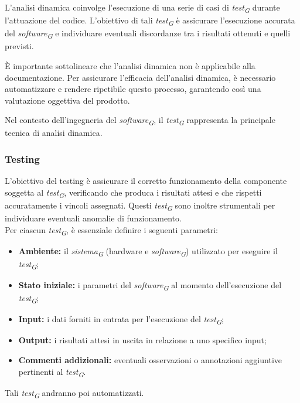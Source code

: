 \vspace{0.2cm}

L'analisi dinamica coinvolge l'esecuzione di una serie di casi di \textit{test}\textsubscript{\textit{G}} durante l'attuazione del codice. L'obiettivo di tali \textit{test}\textsubscript{\textit{G}} è assicurare l'esecuzione accurata del \textit{software}\textsubscript{\textit{G}} e individuare eventuali discordanze tra i risultati ottenuti e quelli previsti. 

\vspace{0.2cm}

È importante sottolineare che l'analisi dinamica non è applicabile alla documentazione.
Per assicurare l'efficacia dell'analisi dinamica, è necessario automatizzare e rendere ripetibile questo processo, garantendo così una valutazione oggettiva del prodotto.

Nel contesto dell'ingegneria del \textit{software}\textsubscript{\textit{G}}, il \textit{test}\textsubscript{\textit{G}} rappresenta la principale tecnica di analisi dinamica.

\subsubsection{Testing}
\label{subsubsec:Testing}
L'obiettivo del testing è assicurare il corretto funzionamento della componente soggetta al \textit{test}\textsubscript{\textit{G}}, verificando che produca i risultati attesi e che rispetti accuratamente i vincoli assegnati. Questi \textit{test}\textsubscript{\textit{G}} sono inoltre strumentali per individuare eventuali anomalie di funzionamento. \\
Per ciascun \textit{test}\textsubscript{\textit{G}}, è essenziale definire i seguenti parametri:

\begin{itemize}
    \item \textbf{Ambiente:} 
        il \textit{sistema}\textsubscript{\textit{G}} (hardware e \textit{software}\textsubscript{\textit{G}}) utilizzato per eseguire il \textit{test}\textsubscript{\textit{G}};
    \item \textbf{Stato iniziale:} 
        i parametri del \textit{software}\textsubscript{\textit{G}} al momento dell'esecuzione del \textit{test}\textsubscript{\textit{G}};
    \item \textbf{Input:} 
        i dati forniti in entrata per l'esecuzione del \textit{test}\textsubscript{\textit{G}};
    \item \textbf{Output:} 
        i risultati attesi in uscita in relazione a uno specifico input;
    \item \textbf{Commenti addizionali:} 
        eventuali osservazioni o annotazioni aggiuntive pertinenti al \textit{test}\textsubscript{\textit{G}}.
\end{itemize}
Tali \textit{test}\textsubscript{\textit{G}} andranno poi automatizzati. 

